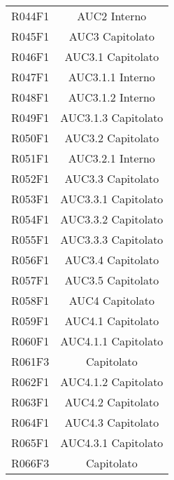 \documentclass[../analisi-dei-requisiti.tex]{subfiles}
\begin{document}
\begin{longtable}[H]{c|c}
  R044F1                               & AUC2 Interno                  \\
  R045F1                               & AUC3 Capitolato               \\
  R046F1                               & AUC3.1 Capitolato             \\
  R047F1                               & AUC3.1.1 Interno              \\
  R048F1                               & AUC3.1.2 Interno              \\
  R049F1                               & AUC3.1.3 Capitolato           \\
  R050F1                               & AUC3.2 Capitolato             \\
  R051F1                               & AUC3.2.1 Interno              \\
  R052F1                               & AUC3.3 Capitolato             \\
  R053F1                               & AUC3.3.1 Capitolato           \\
  R054F1                               & AUC3.3.2 Capitolato           \\
  R055F1                               & AUC3.3.3 Capitolato           \\
  R056F1                               & AUC3.4 Capitolato             \\
  R057F1                               & AUC3.5 Capitolato             \\
  R058F1                               & AUC4 Capitolato               \\
  R059F1                               & AUC4.1 Capitolato             \\
  R060F1                               & AUC4.1.1 Capitolato           \\
  R061F3                               & Capitolato                    \\
  R062F1                               & AUC4.1.2 Capitolato           \\
  R063F1                               & AUC4.2 Capitolato             \\
  R064F1                               & AUC4.3 Capitolato             \\
  R065F1                               & AUC4.3.1 Capitolato           \\
  R066F3                               & Capitolato                    \\

\end{longtable}
\end{document}
